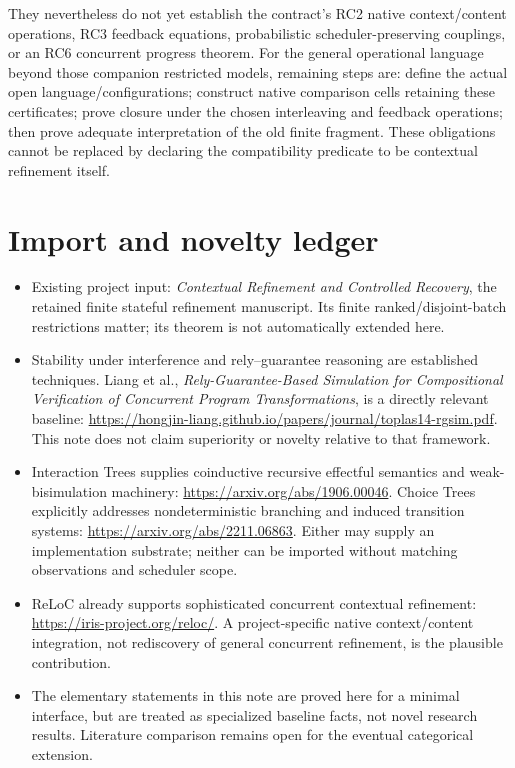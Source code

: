 \documentclass[11pt]{article}
\begin{document}
They nevertheless do not yet establish the contract's RC2 native context/content operations, RC3 feedback equations, probabilistic scheduler-preserving couplings, or an RC6 concurrent progress theorem. For the general operational language beyond those companion restricted models, remaining steps are: define the actual open language/configurations; construct native comparison cells retaining these certificates; prove closure under the chosen interleaving and feedback operations; then prove adequate interpretation of the old finite fragment. These obligations cannot be replaced by declaring the compatibility predicate to be contextual refinement itself.

\section{Import and novelty ledger}
\begin{itemize}
\item Existing project input: \emph{Contextual Refinement and Controlled Recovery}, the retained finite stateful refinement manuscript. Its finite ranked/disjoint-batch restrictions matter; its theorem is not automatically extended here.
\item Stability under interference and rely--guarantee reasoning are established techniques. Liang et al., \emph{Rely-Guarantee-Based Simulation for Compositional Verification of Concurrent Program Transformations}, is a directly relevant baseline: \url{https://hongjin-liang.github.io/papers/journal/toplas14-rgsim.pdf}. This note does not claim superiority or novelty relative to that framework.
\item Interaction Trees supplies coinductive recursive effectful semantics and weak-bisimulation machinery: \url{https://arxiv.org/abs/1906.00046}. Choice Trees explicitly addresses nondeterministic branching and induced transition systems: \url{https://arxiv.org/abs/2211.06863}. Either may supply an implementation substrate; neither can be imported without matching observations and scheduler scope.
\item ReLoC already supports sophisticated concurrent contextual refinement: \url{https://iris-project.org/reloc/}. A project-specific native context/content integration, not rediscovery of general concurrent refinement, is the plausible contribution.
\item The elementary statements in this note are proved here for a minimal interface, but are treated as specialized baseline facts, not novel research results. Literature comparison remains open for the eventual categorical extension.
\end{itemize}
\end{document}

